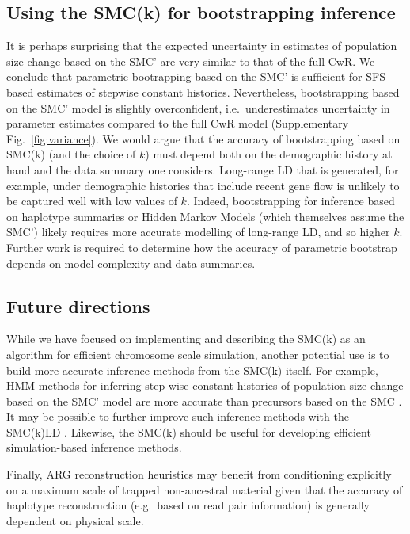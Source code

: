 \documentclass[9pt,twocolumn,twoside,lineno]{gsajnl}
\begin{document}
\subsection{Using the SMC(k) for bootstrapping inference}

It is perhaps surprising that the expected uncertainty in estimates of population size change based on the SMC' are very similar to that of the full CwR. We conclude that parametric bootrapping based on the SMC' is sufficient for SFS based estimates of stepwise constant histories. Nevertheless, bootstrapping based on the SMC' model is slightly overconfident, i.e.\ underestimates uncertainty in parameter estimates compared to the full CwR model (Supplementary Fig.~\ref{fig:variance}). We would argue that the accuracy of bootstrapping based on SMC(k) (and the choice of $k$) must depend both on the demographic history at hand and the data summary one considers. Long-range LD that is generated, for example, under demographic histories that include recent gene flow is unlikely to be captured well with low values of $k$. Indeed, bootstrapping for inference based on haplotype summaries or Hidden Markov Models (which themselves assume the SMC') likely requires more accurate modelling of long-range LD, and so higher $k$. Further work is required to determine how the accuracy of parametric bootstrap depends on model complexity and data summaries.

\subsection{Future directions}
While we have focused on implementing and describing the SMC(k) as an algorithm for efficient chromosome scale simulation, another potential use is to build more accurate inference methods from the SMC(k) itself. For example, HMM methods for inferring step-wise constant histories of population size change based on the SMC' model \citep{schiffels_inferring_2014} are more accurate than precursors based on the SMC \citep{li_inference_2011}. It may be possible to further improve such inference methods with the SMC(k)LD . Likewise, the SMC(k) should be useful for developing efficient simulation-based inference methods.

Finally, ARG reconstruction heuristics may benefit from conditioning explicitly on a maximum scale of trapped non-ancestral material given that the accuracy of haplotype reconstruction (e.g.\ based on read pair information) is generally dependent on physical scale.
\end{document}
